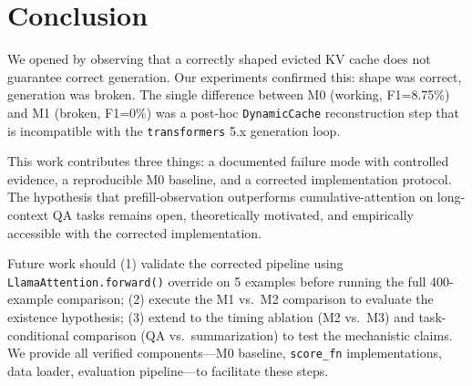 \section{Conclusion}
\label{sec:conclusion}

We opened by observing that a correctly shaped evicted KV cache does not guarantee correct generation. Our experiments confirmed this: shape was correct, generation was broken. The single difference between M0 (working, F1=8.75\%) and M1 (broken, F1=0\%) was a post-hoc \texttt{DynamicCache} reconstruction step that is incompatible with the \texttt{transformers} 5.x generation loop.

This work contributes three things: a documented failure mode with controlled evidence, a reproducible M0 baseline, and a corrected implementation protocol. The hypothesis that prefill-observation outperforms cumulative-attention on long-context QA tasks remains open, theoretically motivated, and empirically accessible with the corrected implementation.

Future work should (1) validate the corrected pipeline using \texttt{LlamaAttention.forward()} override on 5 examples before running the full 400-example comparison; (2) execute the M1 vs.\ M2 comparison to evaluate the existence hypothesis; (3) extend to the timing ablation (M2 vs.\ M3) and task-conditional comparison (QA vs.\ summarization) to test the mechanistic claims. We provide all verified components---M0 baseline, \texttt{score\_fn} implementations, data loader, evaluation pipeline---to facilitate these steps.
